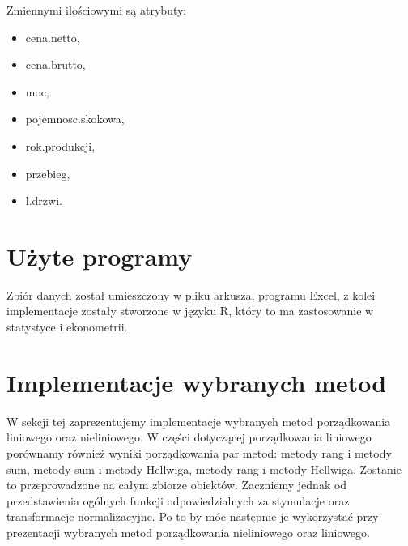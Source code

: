 \documentclass[12pt,a4paper]{report}
\begin{document}
Zmiennymi ilościowymi są atrybuty:
\begin{multicols}{3}
\begin{itemize}
 \item cena.netto,%
 \item cena.brutto,%
 \item moc,%
 \item pojemnosc.skokowa,%
 \item rok.produkcji, %
 \item przebieg,%
 \item l.drzwi. %
\end{itemize}
\end{multicols}

%

\section{Użyte programy}
Zbiór danych został umieszczony w pliku arkusza, programu Excel, z kolei implementacje zostały stworzone w języku R, który to ma zastosowanie w statystyce i ekonometrii. 


\section{Implementacje wybranych metod}
W sekcji tej zaprezentujemy implementacje wybranych metod porządkowania liniowego oraz nieliniowego. W części dotyczącej porządkowania liniowego porównamy również wyniki porządkowania par metod: metody rang i metody sum, metody sum i metody Hellwiga, metody rang i metody Hellwiga. Zostanie to przeprowadzone na całym zbiorze obiektów. 
Zaczniemy jednak od przedstawienia ogólnych funkcji odpowiedzialnych za stymulacje oraz transformacje normalizacyjne. Po to by móc następnie je wykorzystać przy prezentacji wybranych metod porządkowania nieliniowego oraz liniowego. 
\end{document}
